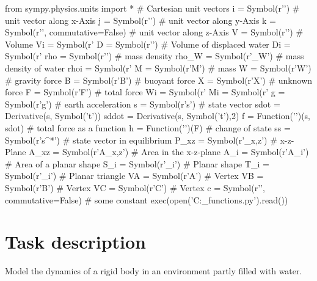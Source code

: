 
\tableofcontents

\begin{sympycode}

from sympy.physics.units import *
# Cartesian unit vectors
i = Symbol(r'') # unit vector along x-Axis
j = Symbol(r'') # unit vector along y-Axis
k = Symbol(r'', commutative=False) # unit vector along z-Axis
V = Symbol(r'') # Volume
Vi = Symbol(r'%
D = Symbol(r'') # Volume of displaced water
Di = Symbol(r'%
rho = Symbol(r'\rho') # mass density
rho_W = Symbol(r'\rho_W') # mass density of water
rhoi = Symbol(r'%
M = Symbol(r'M') # mass
W = Symbol(r'W') # gravity force
B = Symbol(r'B') # buoyant force
X = Symbol(r'X') # unknown force
F = Symbol(r'F') # total force
Wi = Symbol(r' %
Mi = Symbol(r' %
g = Symbol(r'g') # earth acceleration
s = Symbol(r's') # state vector
sdot = Derivative(s, Symbol('t'))
sddot = Derivative(s, Symbol('t'),2)
f = Function('')(s, sdot) # total force as a function
h = Function('')(F) # change of state 
ss = Symbol(r's^*') # state vector in equilibrium
P_xz = Symbol(r'_{x,z}') # x-z-Plane
A_xz = Symbol(r'A_{x,z}') # Area in the x-z-plane 
A_i = Symbol(r'A_{i}') # Area of a planar shape
S_i = Symbol(r'_{i}') # Planar shape 
T_i = Symbol(r'_{i}') # Planar triangle
VA = Symbol(r'A') # Vertex 
VB = Symbol(r'B') # Vertex 
VC = Symbol(r'C') # Vertex 
c = Symbol(r'', commutative=False) # some constant
exec(open('C:\Users\Murad\evrythg\pythontex_functions.py').read())
\end{sympycode}
\section{Task description}
Model the dynamics of a rigid body in an environment partly filled with water.
